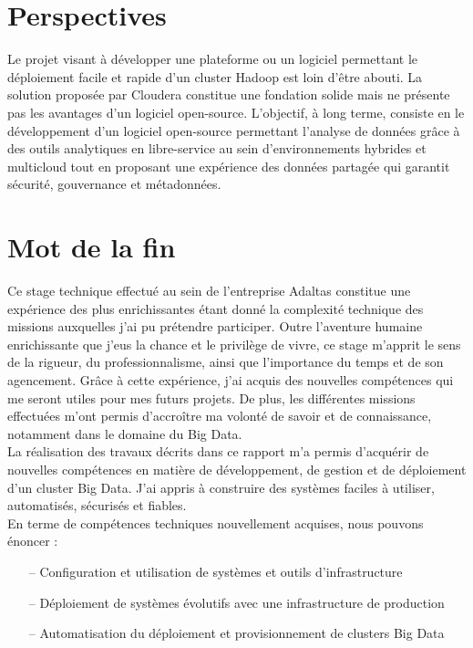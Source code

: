 \documentclass[12pt, french]{report}
\begin{document}
\section{Perspectives}

Le projet visant à développer une plateforme ou un logiciel permettant le déploiement facile et rapide d'un cluster Hadoop est loin d'être abouti. La solution proposée par Cloudera constitue une fondation solide mais ne présente pas les avantages d'un logiciel open-source. L'objectif, à long terme, consiste en le développement d'un logiciel open-source permettant l’analyse de données grâce à des outils analytiques en libre-service au sein d’environnements hybrides et multicloud tout en proposant une expérience des données partagée qui garantit sécurité, gouvernance et métadonnées.

\section{Mot de la fin}

Ce stage technique effectué au sein de l’entreprise Adaltas constitue une expérience des plus enrichissantes étant donné la complexité technique des missions auxquelles j'ai pu prétendre participer. Outre l’aventure humaine enrichissante que j’eus la chance et le privilège de vivre, ce stage m’apprit le sens de la rigueur, du professionnalisme, ainsi que l’importance du temps et de son agencement. Grâce à cette expérience, j’ai acquis des nouvelles compétences qui me seront utiles pour mes futurs projets. De plus, les différentes missions effectuées m’ont permis d’accroître ma volonté de savoir et de connaissance, notamment dans le domaine du Big Data.\\

La réalisation des travaux décrits dans ce rapport m'a permis d'acquérir de nouvelles compétences en matière de développement, de gestion et de déploiement d'un cluster Big Data. J'ai appris à construire des systèmes faciles à utiliser, automatisés, sécurisés et fiables.\\

En terme de compétences techniques nouvellement acquises, nous pouvons énoncer :

\begin{itemize}
\item [--] Configuration et utilisation de systèmes et outils d'infrastructure
\item [--] Déploiement de systèmes évolutifs avec une infrastructure de production
\item [--] Automatisation du déploiement et provisionnement de clusters Big Data
\end{itemize}
\end{document}

